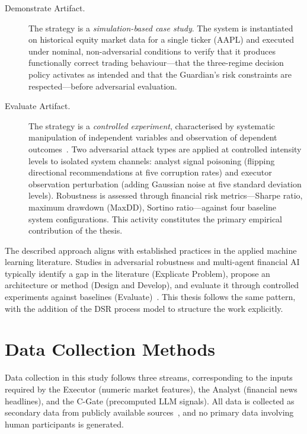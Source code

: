 \begin{description}
    \item[Demonstrate Artifact.] The strategy is a \textit{simulation-based case
    study}. The system is instantiated on historical equity market data for a
    single ticker (AAPL) and executed under nominal, non-adversarial conditions
    to verify that it produces functionally correct trading behaviour---that the
    three-regime decision policy activates as intended and that the Guardian's
    risk constraints are respected---before adversarial evaluation.

    \item[Evaluate Artifact.] The strategy is a \textit{controlled experiment},
    characterised by systematic manipulation of independent variables and
    observation of dependent outcomes~\cite{denscombe2017good}. Two adversarial
    attack types are applied at controlled intensity levels to isolated system
    channels: analyst signal poisoning (flipping directional recommendations at
    five corruption rates) and executor observation perturbation (adding Gaussian
    noise at five standard deviation levels). Robustness is assessed through
    financial risk metrics---Sharpe ratio, maximum drawdown (MaxDD), Sortino
    ratio---against four baseline system configurations. This activity
    constitutes the primary empirical contribution of the thesis.
\end{description}

The described approach aligns with established practices in the applied machine
learning literature. Studies in adversarial robustness and multi-agent
financial AI typically identify a gap in the literature (Explicate Problem),
propose an architecture or method (Design and Develop), and evaluate it through
controlled experiments against baselines
(Evaluate)~\cite{benhenda2025finrl, xia_bayesian_2026, baviskar2025robust}.
This thesis follows the same pattern, with the addition of the DSR process
model to structure the work explicitly.


\section{Data Collection Methods} \label{sec:data_collection}

Data collection in this study follows three streams, corresponding to the inputs
required by the Executor (numeric market features), the Analyst (financial news
headlines), and the C-Gate (precomputed LLM signals). All data is collected as
secondary data from publicly available sources~\cite{denscombe2017good}, and no
primary data involving human participants is generated.

